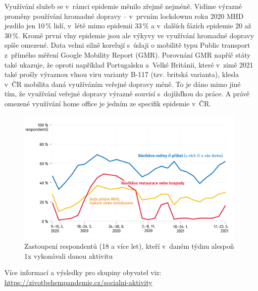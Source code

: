Využívání služeb se v rámci epidemie měnilo zřejmě nejméně. Vidíme výrazné proměny používání hromadné dopravy – v prvním lockdownu roku 2020 MHD jezdilo jen 10\,\% lidí, v létě mimo epidemii 33\,\% a v dalších fázích epidemie 20 až 30\,\%. Kromě první vlny epidemie jsou ale výkyvy ve využívání hromadné dopravy spíše omezené. Data velmi silně korelují s údaji o mobilitě typu Public transport z přímého měření Google Mobility Report (GMR). Porovnání GMR napříč státy také ukazuje, že oproti například Portugalsku a Velké Británii, které v zimě 2021 také prošly výraznou vlnou viru varianty B-117 (tzv. britská varianta), klesla v ČR mobilita daná využíváním veřejné dopravy méně. To je dáno mimo jiné tím, že využívání veřejné dopravy výrazně souvisí s dojížďkou do práce. A právě omezené využívání home office je jedním ze specifik epidemie v ČR.

\begin{figure}[ht]
    \centering
    \includegraphics[width=\textwidth]{./pic/zbp-graf3.png}
    \caption{Zastoupení respondentů (18 a více let), kteří v daném týdnu alespoň 1x vykonávali danou aktivitu}
    \label{fig:zbp3}
\end{figure}


Více informací a výsledky pro skupiny obyvatel viz: \url{https://zivotbehempandemie.cz/socialni-aktivity}



